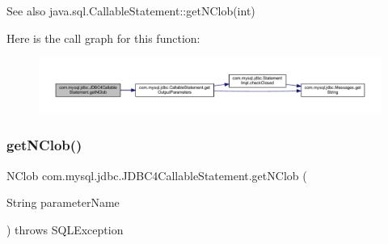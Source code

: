 \begin{DoxySeeAlso}{See also}
java.\+sql.\+Callable\+Statement\+::get\+N\+Clob(int) 
\end{DoxySeeAlso}
Here is the call graph for this function\+:
\nopagebreak
\begin{figure}[H]
\begin{center}
\leavevmode
\includegraphics[width=350pt]{classcom_1_1mysql_1_1jdbc_1_1_j_d_b_c4_callable_statement_a0c1a156017f1eb908fcfca7c724edacb_cgraph}
\end{center}
\end{figure}
\mbox{\label{classcom_1_1mysql_1_1jdbc_1_1_j_d_b_c4_callable_statement_aefb73c39ced84e5e0e96825272f0017f}} 
\subsubsection{\texorpdfstring{get\+N\+Clob()}{getNClob()}\hspace{0.1cm}{\footnotesize\ttfamily [2/2]}}
{\footnotesize\ttfamily N\+Clob com.\+mysql.\+jdbc.\+J\+D\+B\+C4\+Callable\+Statement.\+get\+N\+Clob (\begin{DoxyParamCaption}\item[{String}]{parameter\+Name }\end{DoxyParamCaption}) throws S\+Q\+L\+Exception}

